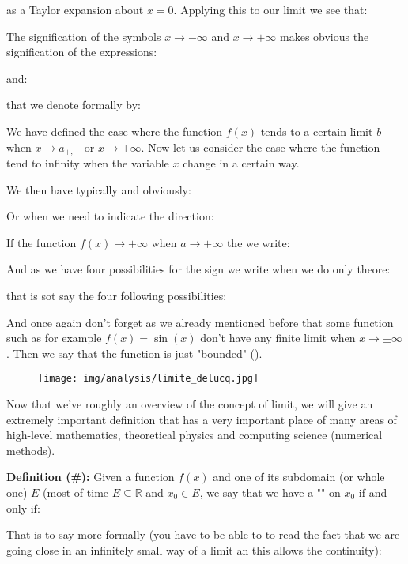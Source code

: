 	\pagebreak
	\begin{tcolorbox}[colframe=black,colback=white,sharp corners]
	
	as a Taylor expansion about $x=0$. Applying this to our limit we see that:
	
	\end{tcolorbox}
	
	The signification of the symbols $x\rightarrow -\infty$ and $x\rightarrow +\infty$ makes obvious the signification of the expressions:
	
	and:
	
	that we denote formally by:	
	
	We have defined the case where the function $f (x)$ tends to a certain limit $b$ when $x\rightarrow a_{+,-}$ or $x\rightarrow \pm \infty$. Now let us consider the case where the function tend to infinity when the variable $x$ change in a certain way.
	
	We then have typically and obviously:
	
	Or when we need to indicate the direction:
	
	If the function $f(x) \rightarrow +\infty$ when $a \rightarrow +\infty$ the we write:
	
	And as we have four possibilities for the sign we write when we do only theore:
	
	that is sot say the four following possibilities:
	
	And once again don't forget as we already mentioned before that some function such as for example $f(x)=\sin(x)$ don't have any finite limit when $x\rightarrow \pm \infty$. Then we say that the function is just "bounded" ().
	\begin{figure}[H]
		\centering
		\texttt{[image: img/analysis/limite\_delucq.jpg]}
	\end{figure}
	Now that we've roughly an overview of the concept of limit, we will give an extremely important definition that has a very important place of many areas of high-level mathematics, theoretical physics and computing science (numerical methods).
	
	\textbf{Definition (\#\mydef):} Given a function $f(x)$ and one of its subdomain (or whole one) $E$ (most of time $E \subseteq \mathbb{R}$ and $x_0\in E$, we say that we have a "" on $x_0$ if and only if:
	
	That is to say more formally (you have to be able to to read the fact that we are going close in an infinitely small way of a limit an this allows the continuity):
	

